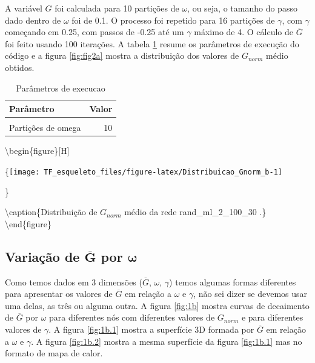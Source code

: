 \documentclass[
  12pt,
]{article}
\begin{document}
A variável \(G\) foi calculada para 10 partições de \(\omega\), ou seja,
o tamanho do passo dado dentro de \(\omega\) foi de 0.1. O processo foi
repetido para 16 partições de \(\gamma\), com \(\gamma\) começando em
0.25, com passos de -0.25 até um \(\gamma\) máximo de 4. O cálculo de
\(\overline{G}\) foi feito usando 100 iterações. A tabela \ref{tab:2a}
resume os parâmetros de execução do código e a figura \ref{fig:fig2a}
mostra a distribuição dos valores de \(G_{norm}\) médio obtidos.

\begin{table}[!h]

\caption{\label{tab:Parametros_Execucao_b}\label{tab:2a}Parâmetros de execucao}
\centering
\begin{tabular}[t]{lr}
\toprule
Parâmetro & Valor\\
\midrule
\cellcolor{gray!6}{Iterações} & \cellcolor{gray!6}{100}\\
Partições de omega & 10\\
\bottomrule
\end{tabular}
\end{table}

\textbackslash begin\{figure\}{[}H{]}

\{\centering \texttt{[image: TF\_esqueleto\_files/figure-latex/Distribuicao\_Gnorm\_b-1]}

\}

\textbackslash caption\{\label{fig:fig2a}Distribuição de \(G_{norm}\)
médio da rede rand\_ml\_2\_100\_30 .\}\label{fig:Distribuicao_Gnorm_b}
\textbackslash end\{figure\}

\hypertarget{variauxe7uxe3o-de-mathbfoverlineg-por-boldsymbolomega-1}{%
\subsection{\texorpdfstring{Variação de \(\mathbf{\overline{G}}\) por
\(\boldsymbol{\omega}\)}{Variação de \textbackslash mathbf\{\textbackslash overline\{G\}\} por \textbackslash boldsymbol\{\textbackslash omega\}}}\label{variauxe7uxe3o-de-mathbfoverlineg-por-boldsymbolomega-1}}

Como temos dados em 3 dimensões (\(\overline{G}\), \(\omega\),
\(\gamma\)) temos algumas formas diferentes para apresentar os valores
de \(\overline{G}\) em relação a \(\omega\) e \(\gamma\), não sei dizer
se devemos usar uma delas, as três ou alguma outra. A figura
\ref{fig:1b} mostra curvas de decaimento de \(\overline{G}\) por
\(\omega\) para diferentes nós com diferentes valores de \(G_{norm}\) e
para diferentes valores de \(\gamma\). A figura \ref{fig:1b.1} mostra a
superfície 3D formada por \(\overline{G}\) em relação a \(\omega\) e
\(\gamma\). A figura \ref{fig:1b.2} mostra a mesma superfície da figura
\ref{fig:1b.1} mas no formato de mapa de calor.
\end{document}
